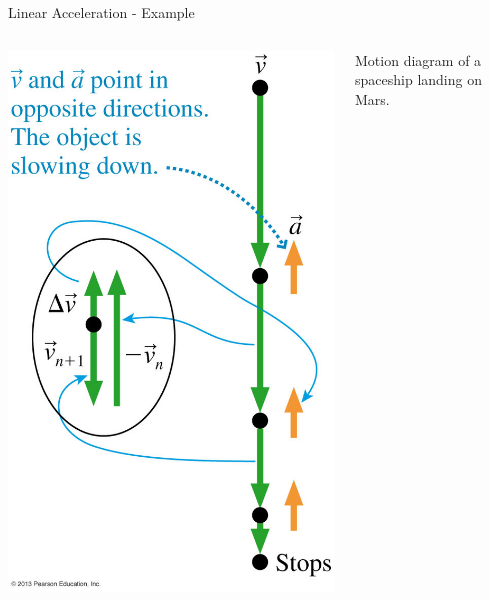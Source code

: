 \documentclass{beamer}
\begin{document}
\begin{frame}{Linear Acceleration - Example}
\begin{columns}
\begin{column}{0.70\textwidth}
   \begin{center}
      \includegraphics[height=0.9\textheight]{../figures/01_16_Figure.jpg}
   \end{center}
\end{column}
\begin{column}{0.3\textwidth}
   Motion diagram of a spaceship landing on Mars.
\end{column}
\end{columns}
\end{frame}
\end{document}
